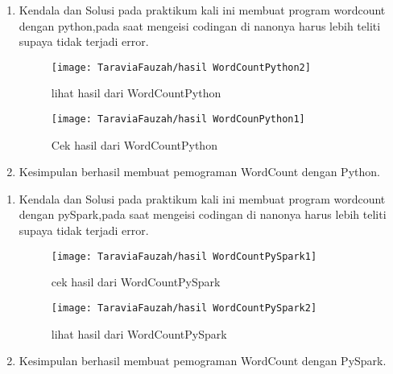 \begin{enumerate}
\item Kendala dan Solusi
\newline pada praktikum kali ini membuat program wordcount dengan python,pada saat mengeisi codingan di nanonya harus lebih teliti supaya tidak terjadi error.

\begin{figure}[!ht]
\texttt{[image: TaraviaFauzah/hasil WordCountPython2]}
\caption{lihat hasil dari WordCountPython }
\label{gam:perkuliahan2-15}
\end{figure}

\begin{figure}[!ht]
\texttt{[image: TaraviaFauzah/hasil WordCounPython1]}
\caption{Cek hasil dari WordCountPython }
\label{gam:perkuliahan2-15}
\end{figure}

\item Kesimpulan
\newline berhasil membuat pemograman WordCount dengan Python.
\end{enumerate}

\begin{enumerate}
\item Kendala dan Solusi
\newline pada praktikum kali ini membuat program wordcount dengan pySpark,pada saat mengeisi codingan di nanonya harus lebih teliti supaya tidak terjadi error.

\begin{figure}[!ht]
\texttt{[image: TaraviaFauzah/hasil WordCountPySpark1]}
\caption{cek hasil dari WordCountPySpark }
\label{gam:perkuliahan2-15}
\end{figure}

\begin{figure}[!ht]
\texttt{[image: TaraviaFauzah/hasil WordCountPySpark2]}
\caption{lihat hasil dari WordCountPySpark }
\label{gam:perkuliahan2-15}
\end{figure}

\item Kesimpulan
\newline berhasil membuat pemograman WordCount dengan PySpark.
\end{enumerate}

